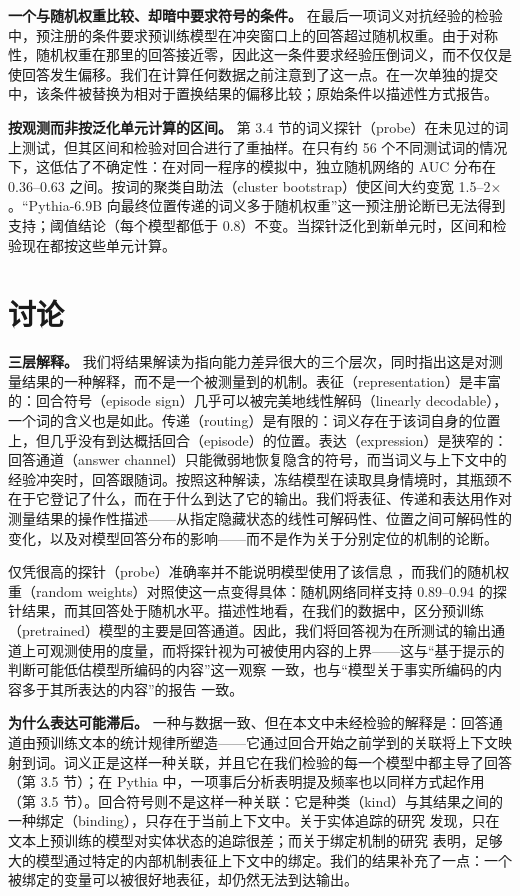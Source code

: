 \documentclass[UTF8,fontset=none,a4paper]{ctexart}
\begin{document}
\textbf{一个与随机权重比较、却暗中要求符号的条件。} 在最后一项词义对抗经验的检验中，预注册的条件要求预训练模型在冲突窗口上的回答超过随机权重。由于对称性，随机权重在那里的回答接近零，因此这一条件要求经验压倒词义，而不仅仅是使回答发生偏移。我们在计算任何数据之前注意到了这一点。在一次单独的提交中，该条件被替换为相对于置换结果的偏移比较；原始条件以描述性方式报告。

\textbf{按观测而非按泛化单元计算的区间。} 第 3.4 节的词义探针（probe）在未见过的词上测试，但其区间和检验对回合进行了重抽样。在只有约 56 个不同测试词的情况下，这低估了不确定性：在对同一程序的模拟中，独立随机网络的 AUC 分布在 \mbox{0.36--0.63} 之间。按词的聚类自助法（cluster bootstrap）使区间大约变宽 \mbox{1.5--2}$\times$。``\mbox{Pythia-6.9B} 向最终位置传递的词义多于随机权重''这一预注册论断已无法得到支持；阈值结论（每个模型都低于 0.8）不变。当探针泛化到新单元时，区间和检验现在都按这些单元计算。


\section{讨论}

\textbf{三层解释。} 我们将结果解读为指向能力差异很大的三个层次，同时指出这是对测量结果的一种解释，而不是一个被测量到的机制。表征（representation）是丰富的：回合符号（episode sign）几乎可以被完美地线性解码（linearly decodable），一个词的含义也是如此。传递（routing）是有限的：词义存在于该词自身的位置上，但几乎没有到达概括回合（episode）的位置。表达（expression）是狭窄的：回答通道（answer channel）只能微弱地恢复隐含的符号，而当词义与上下文中的经验冲突时，回答跟随词。按照这种解读，冻结模型在读取具身情境时，其瓶颈不在于它登记了什么，而在于什么到达了它的输出。我们将表征、传递和表达用作对测量结果的操作性描述------从指定隐藏状态的线性可解码性、位置之间可解码性的变化，以及对模型回答分布的影响------而不是作为关于分别定位的机制的论断。

仅凭很高的探针（probe）准确率并不能说明模型使用了该信息 \citep{hewitt2019,belinkov2021,elazar2020}，而我们的随机权重（random weights）对照使这一点变得具体：随机网络同样支持 \mbox{0.89--0.94} 的探针结果，而其回答处于随机水平。描述性地看，在我们的数据中，区分预训练（pretrained）模型的主要是回答通道。因此，我们将回答视为在所测试的输出通道上可观测使用的度量，而将探针视为可被使用内容的上界------这与``基于提示的判断可能低估模型所编码的内容''这一观察 \citep{hu2023} 一致，也与``模型关于事实所编码的内容多于其所表达的内容''的报告 \citep{orgad2024,gekhman2025} 一致。

\textbf{为什么表达可能滞后。} 一种与数据一致、但在本文中未经检验的解释是：回答通道由预训练文本的统计规律所塑造------它通过回合开始之前学到的关联将上下文映射到词。词义正是这样一种关联，并且它在我们检验的每一个模型中都主导了回答（第 3.5 节）；在 Pythia 中，一项事后分析表明提及频率也以同样方式起作用（第 3.5 节）。回合符号则不是这样一种关联：它是种类（kind）与其结果之间的一种绑定（binding），只存在于当前上下文中。关于实体追踪的研究 \citep{kim2023} 发现，只在文本上预训练的模型对实体状态的追踪很差；而关于绑定机制的研究 \citep{feng2023} 表明，足够大的模型通过特定的内部机制表征上下文中的绑定。我们的结果补充了一点：一个被绑定的变量可以被很好地表征，却仍然无法到达输出。
\end{document}
